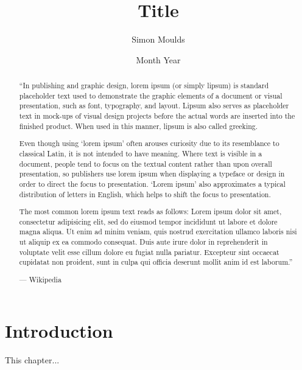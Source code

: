 \documentclass{icldt}\usepackage[]{graphicx}\usepackage[]{color}
\title{Title}
\author{Simon Moulds}
\date{Month Year}
\begin{document}
\maketitle

\begin{abstract}

``In publishing and graphic design, lorem ipsum (or simply lipsum) is standard
placeholder text used to demonstrate the graphic elements of a document or
visual presentation, such as font, typography, and layout. Lipsum also serves as
placeholder text in mock-ups of visual design projects before the actual words
are inserted into the finished product. When used in this manner, lipsum is also
called greeking.

Even though using `lorem ipsum' often arouses curiosity due to its resemblance
to classical Latin, it is not intended to have meaning. Where text is visible in
a document, people tend to focus on the textual content rather than upon overall
presentation, so publishers use lorem ipsum when displaying a typeface or design
in order to direct the focus to presentation. `Lorem ipsum' also approximates a
typical distribution of letters in English, which helps to shift the focus to
presentation.

The most common lorem ipsum text reads as follows: Lorem ipsum dolor sit amet,
consectetur adipisicing elit, sed do eiusmod tempor incididunt ut labore et
dolore magna aliqua. Ut enim ad minim veniam, quis nostrud exercitation ullamco
laboris nisi ut aliquip ex ea commodo consequat. Duis aute irure dolor in
reprehenderit in voluptate velit esse cillum dolore eu fugiat nulla pariatur.
Excepteur sint occaecat cupidatat non proident, sunt in culpa qui officia
deserunt mollit anim id est laborum.''

\hfill --- Wikipedia
\end{abstract}

\makededication

\tableofcontents
\listoftables
\listoffigures




\chapter{Introduction}

This chapter...
\end{document}
